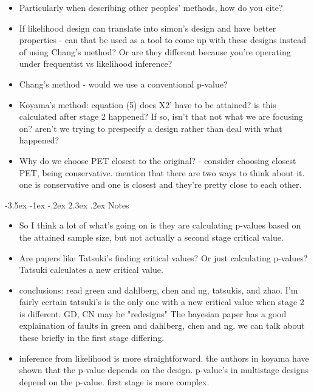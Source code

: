 \documentclass[12pt]{report}\usepackage[]{graphicx}\usepackage[]{color}
\makeatletter
\newlength{\li}\setlength{\li}{14.48pt}
\newlength{\di}\setlength{\di}{-3.5mm}
\renewcommand\section{ \@startsection {section}{1}{\z@}%
                                   {-3.5ex \@plus -1ex \@minus -.2ex}%
                                   {2.3ex \@plus.2ex}%
                                   {\centering\large\fontfamily{qcs}\selectfont}}
\makeatother
\begin{document}
\begin{itemize}
  \item Particularly when describing other peoples' methods, how do you cite?
  \item If likelihood design can translate into simon's design and have better properties - can that be used as a tool to come up with these designs instead of using Chang's method? Or are they different because you're operating under frequentist vs likelihood inference? 
  \item Chang's method - would we use a conventional p-value?
  \item Koyama's method: equation (5) does X2' have to be attained? is this calculated after stage 2 happened? If so, isn't that not what we are focusing on? aren't we trying to prespecify a design rather than deal with what happened?
  \item Why do we choose PET closest to the original? - consider choosing closest PET, being conservative. mention that there are two ways to think about it. one is conservative and one is closest and they're pretty close to each other. 
\end{itemize}

\section{Notes}
\begin{itemize}
  \item So I think a lot of what's going on is they are calculating p-values based on the attained sample size, but not actually a second stage critical value. 
  \item Are papers like Tatsuki's finding critical values? Or just calculating p-values? Tatsuki calculates a new critical value. 
  \item conclusions: read green and dahlberg, chen and ng, tatsukis, and zhao. I'm fairly certain tatsuki's is the only one with a new critical value when stage 2 is different. GD, CN may be "redesigns" The bayesian paper has a good explaination of faults in green and dahlberg, chen and ng. we can talk about these briefly in the first stage differing. 
  \item inference from likelihood is more straightforward. the authors in koyama have shown that the p-value depends on the design. p-value's in multistage designs depend on the p-value. first stage is more complex. 
\end{itemize}



%

		
\end{document}
